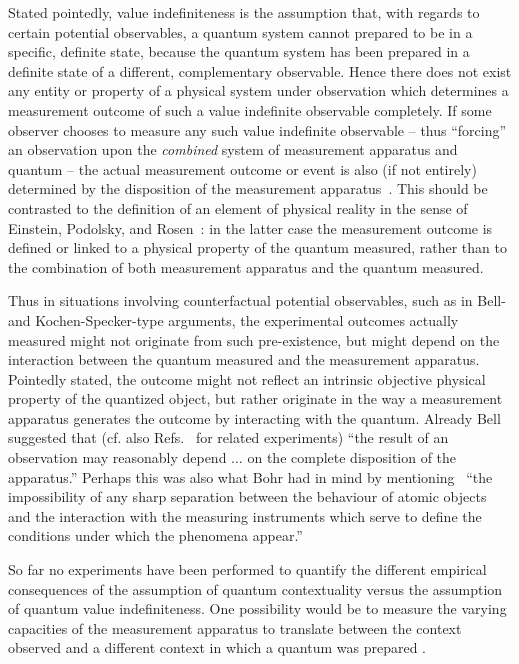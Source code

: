 \documentclass[runningheads]{llncs}
\begin{document}
Stated pointedly, value indefiniteness is the assumption that,
with regards to certain potential observables, a quantum system
cannot prepared to be in a specific, definite state,
because the quantum system has been prepared in a definite state of a different, complementary
observable.
Hence
there does not exist
any entity or property of a physical system under observation
which determines a measurement outcome of such a value indefinite observable completely.
If some observer chooses to measure
any such value indefinite observable
--
thus ``forcing'' an observation upon the {\em
combined} system of measurement apparatus and quantum
--
the actual measurement outcome or event
is also (if not entirely) determined by the
disposition of the measurement apparatus~\cite{bell-66}.
This should be contrasted to the definition of an element of physical reality
in the sense of Einstein, Podolsky, and Rosen~\cite{epr}:
in the latter case the measurement outcome is defined or linked to
a physical property of the quantum measured, rather than to the combination of both
measurement apparatus and the quantum measured.

Thus in situations involving counterfactual potential observables,
such as in Bell- and Kochen-Specker-type arguments,
 the experimental outcomes actually measured might not originate from such pre-existence,
but might depend on the interaction
between the quantum measured and the measurement apparatus.
Pointedly stated, the outcome might not reflect an intrinsic objective physical property
of the quantized object,
but rather originate in the way a measurement apparatus generates the outcome by interacting with the quantum.
Already Bell~\cite{bell-66} suggested that (cf. also Refs.~\cite{PhysRevLett.104.220401,PhysRevLett.106.190401}
for related experiments)
``the result of an observation may reasonably depend $\ldots$
on the complete disposition of the apparatus.''
Perhaps this was also what Bohr had in mind by mentioning~\cite{bohr-1949}
``the impossibility of any sharp separation between the behaviour of atomic
objects and the interaction with the measuring instruments which serve to define the conditions
under which the phenomena appear.''

So far no experiments have been performed
to quantify the different empirical consequences of the assumption of quantum
contextuality versus the assumption of quantum value indefiniteness.
One possibility would be to measure the varying capacities of the measurement apparatus
to translate between the context observed and a different context in which a quantum was prepared
\cite{svozil-2003-garda}.
\end{document}
